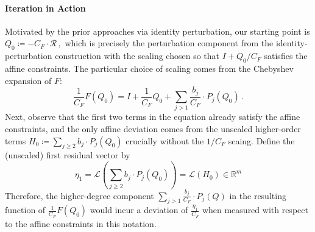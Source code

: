 \documentclass[12pt]{article}
\def \R {\mathbb{R}}
\newcommand{\calR}{\mathcal{R}}
\newcommand{\calL}{\mathcal{L}}
\begin{document}
\paragraph{Iteration in Action}
Motivated by the prior approaches via identity perturbation, our starting point is %
\(
    Q_0
    \coloneqq - C_F \cdot \calR\,,
\)
which is precisely the perturbation component from the identity-perturbation construction with the scaling chosen so that
\(
    I+   Q_0/C_F \)
satisfies the affine constraints. The particular choice of scaling comes from the Chebyshev expansion of $F$: 
\[
    \frac1{C_F}F(  Q_0)  = I+ \frac{1}{C_F} Q_0 + \sum_{j>1} \frac{b_j}{C_F} \cdot P_j(Q_0) \,.
   \]
Next, observe that the first two terms in the equation already satisfy the affine constraints, and the only affine deviation
comes from the unscaled higher-order terms
\(
 H_{0} \coloneqq \sum_{j\ge2} b_j \cdot   P_j( Q_0)\) crucially without the $1/C_F$ scaing. 
Define the (unscaled) first residual vector by \[ \eta_1= \calL(\sum_{j\ge2}  b_j \cdot   P_j(  Q_0)  ) = \calL(H_{0}  ) \in \R^m\]
Therefore, the higher-degree component $ \sum_{j>1} \frac{b_j}{C_F} \cdot P_j(Q) 
$ in the resulting function of $ \frac{1}{C_F} F(Q_0) $ would incur a deviation of $\frac{\eta_1}{C_F}$ when measured with respect to the affine constraints in this notation. 
\end{document}
